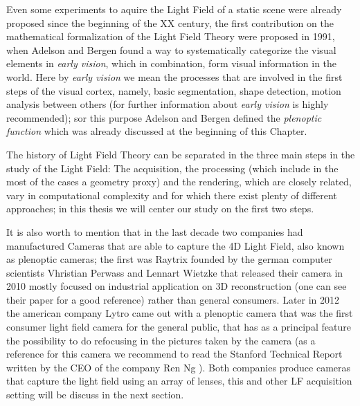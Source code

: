 \bigskip

Even some experiments to aquire the Light Field of a static scene were already proposed since the beginning of the XX century, the first contribution on the mathematical formalization of the Light Field Theory were proposed in 1991, when Adelson and Bergen \cite{AdelsonBergen} found a way to systematically categorize the visual elements in \textit{early vision}, which in combination, form visual information in the world. Here by \textit{early vision} we mean the processes that are involved in the first steps of the visual cortex, namely, basic segmentation, shape detection, motion analysis between others (for further information about \textit{early vision} \cite{Tomasiearly} is highly recommended); sor this purpose Adelson and Bergen defined the \textit{plenoptic function} which was already discussed at the beginning of this Chapter. 

\bigskip

The history of Light Field Theory can be separated in the three main steps in the study of the Light Field: The acquisition, the processing (which include in the most of the cases a geometry proxy) and the rendering, which are closely related, vary in computational complexity and for which there exist plenty of different approaches; in this thesis we will center our study on the first two steps. 

\bigskip

It is also worth to mention that in the last decade two companies had manufactured Cameras that are able to capture the 4D Light Field, also known as plenoptic cameras; the first was Raytrix founded by the german computer scientists Vhristian Perwass and Lennart Wietzke that released their camera in 2010 mostly focused on industrial application on 3D reconstruction (one can see their paper \cite{Raytrix} for a good reference) rather than general consumers. Later in 2012 the american company Lytro came out with a plenoptic camera that was the first consumer light field camera for the general public, that has as a principal feature the possibility to do refocusing in the pictures taken by the camera (as a reference for this camera we recommend to read the Stanford Technical Report written by the CEO of the company Ren Ng \cite{Lytro}). Both companies produce cameras that capture the light field using an array of lenses, this and other LF acquisition setting will be discuss in the next section.

\bigskip

